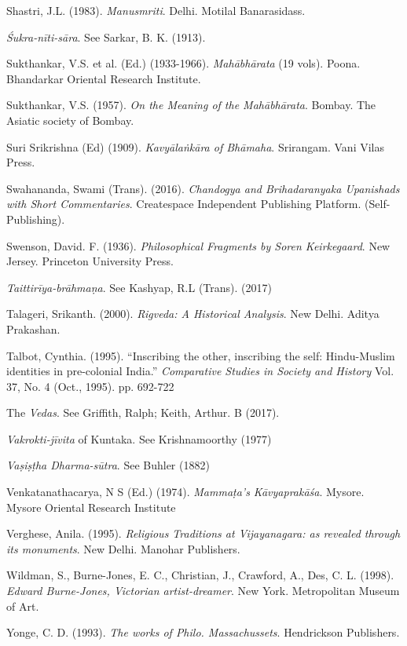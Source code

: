 \begin{thebibliography}{99}
Shastri, J.L. (1983). {\sl Manusmriti}. Delhi. Motilal Banarasidass. 

{\sl Śukra-nīti-sāra}. See Sarkar, B. K. (1913). 

Sukthankar, V.S. et al. (Ed.) (1933-1966). {\sl Mahābhārata} (19 vols). Poona. Bhandarkar Oriental Research Institute. 

Sukthankar, V.S. (1957). {\sl On the Meaning of the Mahābhārata}. Bombay. The Asiatic society of Bombay. 

Suri Srikrishna (Ed) (1909). {\sl Kavyālaṅkāra of Bhāmaha}. Srirangam. Vani Vilas Press. 

Swahananda, Swami (Trans). (2016). {\sl Chandogya and Brihadaranyaka Upanishads with Short Commentaries}. Createspace Independent Publishing Platform. (Self-Publishing). 

Swenson, David. F. (1936). {\sl Philosophical Fragments by Soren Keirkegaard}. New Jersey. Princeton University Press. 

{\sl Taittirīya-brāhmaṇa}. See Kashyap, R.L (Trans). (2017)

Talageri, Srikanth. (2000). {\sl Rigveda: A Historical Analysis}. New Delhi. Aditya Prakashan. 

Talbot, Cynthia. (1995). “Inscribing the other, inscribing the self: Hindu-Muslim identities in pre-colonial India.” {\sl Comparative Studies in Society and History} Vol. 37, No. 4 (Oct., 1995). pp. 692-722

The {\sl Vedas}. See Griffith, Ralph; Keith, Arthur. B (2017).

{\sl Vakrokti-jīvita} of Kuntaka. See Krishnamoorthy (1977)

{\sl Vaṣiṣṭha Dharma-sūtra}. See Buhler (1882)

Venkatanathacarya, N S (Ed.) (1974). {\sl Mammaṭa’s Kāvyaprakāśa}. Mysore. Mysore Oriental Research Institute

Verghese, Anila. (1995). {\sl Religious Traditions at Vijayanagara: as revealed through its monuments}. New  Delhi. Manohar Publishers. 

Wildman, S., Burne-Jones, E. C., Christian, J., Crawford, A., Des, C. L. (1998). {\sl Edward Burne-Jones, Victorian artist-dreamer}. New York. Metropolitan Museum of Art. 

Yonge, C. D. (1993). {\sl The works of Philo. Massachussets}. Hendrickson Publishers.
\end{thebibliography}



\theendnotes

